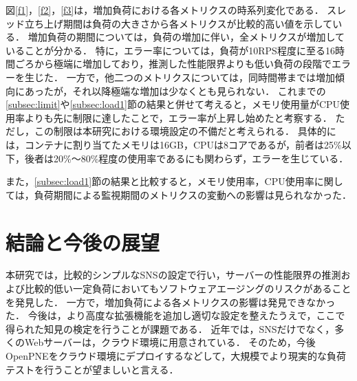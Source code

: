 \documentclass[twoside,twocolumn,10pt]{jarticle}  %
\begin{document}
図\ref{f1}，\ref{f2}，\ref{f3}は，増加負荷における各メトリクスの時系列変化である．
スレッド立ち上げ期間は負荷の大きさから各メトリクスが比較的高い値を示している．
増加負荷の期間については，負荷の増加に伴い，全メトリクスが増加していることが分かる．
特に，エラー率については，負荷が10RPS程度に至る16時間ごろから極端に増加しており，推測した性能限界よりも低い負荷の段階でエラーを生じた．
一方で，他二つのメトリクスについては，同時間帯までは増加傾向にあったが，それ以降極端な増加は少なくとも見られない．
これまでの\ref{subsec:limit}や\ref{subsec:load1}節の結果と併せて考えると，メモリ使用量がCPU使用率よりも先に制限に達したことで，エラー率が上昇し始めたと考察する．
ただし，この制限は本研究における環境設定の不備だと考えられる．
具体的には，コンテナに割り当てたメモリは16GB，CPUは8コアであるが，前者は25\%以下，後者は20\%～80\%程度の使用率であるにも関わらず，エラーを生じている．\par
また，\ref{subsec:load1}節の結果と比較すると，メモリ使用率，CPU使用率に関しては，負荷期間による監視期間のメトリクスの変動への影響は見られなかった．
\section{結論と今後の展望}
本研究では，比較的シンプルなSNSの設定で行い，サーバーの性能限界の推測および比較的低い一定負荷においてもソフトウェアエージングのリスクがあることを発見した．
一方で，増加負荷による各メトリクスの影響は発見できなかった．
今後は，より高度な拡張機能を追加し適切な設定を整えたうえで，ここで得られた知見の検定を行うことが課題である．
近年では，SNSだけでなく，多くのWebサーバーは，クラウド環境に用意されている．
そのため，今後OpenPNEをクラウド環境にデプロイするなどして，大規模でより現実的な負荷テストを行うことが望ましいと言える．
\end{document}

